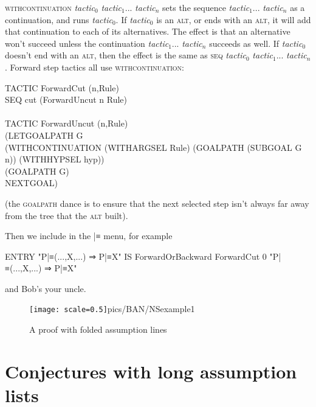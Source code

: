\textsc{withcontinuation} \textit{tactic}$_{0}$ \textit{tactic}$_{1}$... \textit{tactic}$_{\textit{n}}$ sets the sequence \textit{tactic}$_{1}$... \textit{tactic}$_{\textit{n}}$ as a continuation, and runs \textit{tactic}$_{0}$. If \textit{tactic}$_{0}$ is an \textsc{alt}, or ends with an \textsc{alt}, it will add that continuation to each of its alternatives. The effect is that an alternative won't succeed unless the continuation \textit{tactic}$_{1}$... \textit{tactic}$_{\textit{n}}$ succeeds as well. If \textit{tactic}$_{0}$ doesn't end with an \textsc{alt}, then the effect is the same as \textsc{seq} \textit{tactic}$_{0}$ \textit{tactic}$_{1}$... \textit{tactic}$_{\textit{n}}$. Forward step tactics all use \textsc{withcontinuation}:
\begin{japeish}
TACTIC ForwardCut (n,Rule) \\
\tab SEQ cut (ForwardUncut n Rule) \\
 \\
TACTIC ForwardUncut (n,Rule) \\
\tab (LETGOALPATH G  \\
\tab \tab (WITHCONTINUATION (WITHARGSEL Rule) (GOALPATH (SUBGOAL G n)) (WITHHYPSEL hyp)) \\
\tab \tab (GOALPATH G)  \\
\tab \tab NEXTGOAL)
\end{japeish}
(the \textsc{goalpath} dance is to ensure that the next selected step isn't always far away from the tree that the \textsc{alt} built).

Then we include in the |≡ menu, for example
\begin{japeish}
ENTRY "P|≡(...,X,...) ⇒ P|≡X"             IS ForwardOrBackward ForwardCut 0 "P|≡(...,X,...) ⇒ P|≡X"
\end{japeish}
and Bob's your uncle.

\begin{figure}
\centering
\texttt{[image: scale=0.5]}{pics/BAN/NSexample1}
\caption{A proof with folded assumption lines}
\label{fig:BAN:NSexample1}
\end{figure}

\section{Conjectures with long assumption lists}


